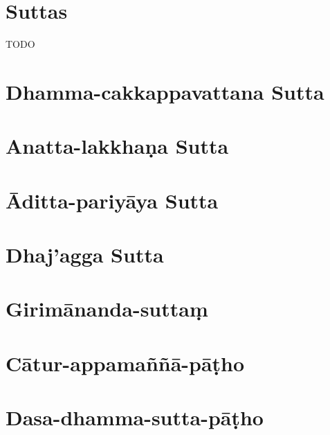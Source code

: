 \chapter{Suttas}

TODO

\chapter{Dhamma-cakkappavattana Sutta}

\chapter{Anatta-lakkhaṇa Sutta}

\chapter{Āditta-pariyāya Sutta}

\chapter{Dhaj'agga Sutta}

\chapter{Girimānanda-suttaṃ}

\chapter{Cātur-appamaññā-pāṭho}

\chapter{Dasa-dhamma-sutta-pāṭho}

